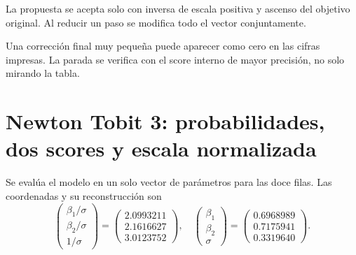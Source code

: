 \documentclass[11pt,a4paper]{article}
\begin{document}
La propuesta se acepta solo con
inversa de escala positiva
y ascenso del objetivo original.
Al reducir un paso se modifica
todo el vector conjuntamente.

Una corrección final muy pequeña
puede aparecer como cero
en las cifras impresas.
La parada se verifica con
el score interno de mayor precisión,
no solo mirando la tabla.

\clearpage
\section{Newton Tobit 3: probabilidades, dos scores y escala normalizada}\label{unidad109}
Se evalúa el modelo en un solo vector
de parámetros para las doce filas.
Las coordenadas y su reconstrucción son
\[
\begin{pmatrix}\beta_1/\sigma\\\beta_2/\sigma\\1/\sigma\end{pmatrix}=\begin{pmatrix}2.0993211\\2.1616627\\3.0123752\end{pmatrix},\quad\begin{pmatrix}\beta_1\\\beta_2\\\sigma\end{pmatrix}=\begin{pmatrix}0.6968989\\0.7175941\\0.3319640\end{pmatrix}.
\]
\end{document}
